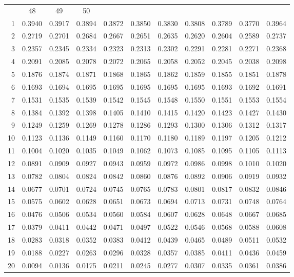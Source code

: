 \documentclass[draft]{article}
\begin{document}
\begin{table}
\begin{center}
\begin{tabular}{rcccccccccc}
  & \multicolumn{1}{c}{48}
  & \multicolumn{1}{c}{49}
  & \multicolumn{1}{c}{50} \\ \cline{2-11}
 1&0.3940&0.3917&0.3894&0.3872&0.3850&0.3830&0.3808&0.3789&0.3770&0.3964\\
 2&0.2719&0.2701&0.2684&0.2667&0.2651&0.2635&0.2620&0.2604&0.2589&0.2737\\
 3&0.2357&0.2345&0.2334&0.2323&0.2313&0.2302&0.2291&0.2281&0.2271&0.2368\\
 4&0.2091&0.2085&0.2078&0.2072&0.2065&0.2058&0.2052&0.2045&0.2038&0.2098\\
 5&0.1876&0.1874&0.1871&0.1868&0.1865&0.1862&0.1859&0.1855&0.1851&0.1878\\
 6&0.1693&0.1694&0.1695&0.1695&0.1695&0.1695&0.1695&0.1693&0.1692&0.1691\\
 7&0.1531&0.1535&0.1539&0.1542&0.1545&0.1548&0.1550&0.1551&0.1553&0.1554\\%
 8&0.1384&0.1392&0.1398&0.1405&0.1410&0.1415&0.1420&0.1423&0.1427&0.1430\\%
 9&0.1249&0.1259&0.1269&0.1278&0.1286&0.1293&0.1300&0.1306&0.1312&0.1317\\%
10&0.1123&0.1136&0.1149&0.1160&0.1170&0.1180&0.1189&0.1197&0.1205&0.1212\\%
11&0.1004&0.1020&0.1035&0.1049&0.1062&0.1073&0.1085&0.1095&0.1105&0.1113\\
12&0.0891&0.0909&0.0927&0.0943&0.0959&0.0972&0.0986&0.0998&0.1010&0.1020\\
13&0.0782&0.0804&0.0824&0.0842&0.0860&0.0876&0.0892&0.0906&0.0919&0.0932\\
14&0.0677&0.0701&0.0724&0.0745&0.0765&0.0783&0.0801&0.0817&0.0832&0.0846\\
15&0.0575&0.0602&0.0628&0.0651&0.0673&0.0694&0.0713&0.0731&0.0748&0.0764\\
16&0.0476&0.0506&0.0534&0.0560&0.0584&0.0607&0.0628&0.0648&0.0667&0.0685\\
17&0.0379&0.0411&0.0442&0.0471&0.0497&0.0522&0.0546&0.0568&0.0588&0.0608\\
18&0.0283&0.0318&0.0352&0.0383&0.0412&0.0439&0.0465&0.0489&0.0511&0.0532\\
19&0.0188&0.0227&0.0263&0.0296&0.0328&0.0357&0.0385&0.0411&0.0436&0.0459\\
20&0.0094&0.0136&0.0175&0.0211&0.0245&0.0277&0.0307&0.0335&0.0361&0.0386\\

\end{tabular}
\end{center}
\end{table}
\end{document}
